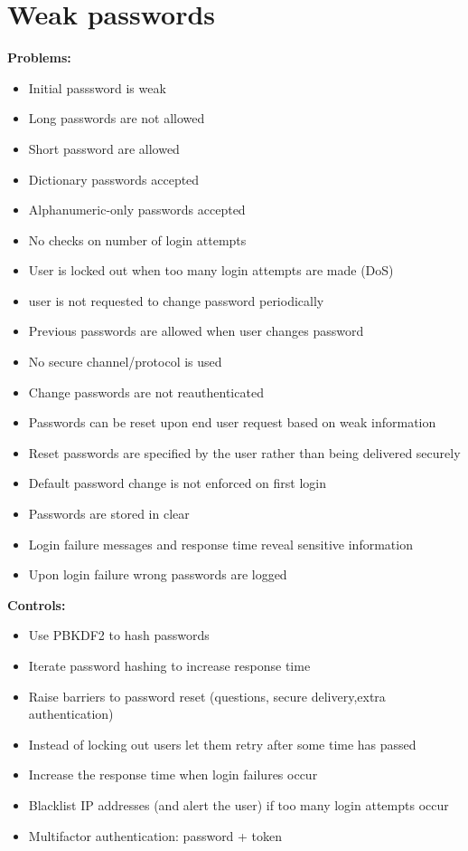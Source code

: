 \documentclass[10pt,a4paper]{article}
\begin{document}
\section{Weak passwords}
\textbf{Problems:}
\begin{itemize}
\item Initial passsword is weak
\item Long passwords are not allowed
\item Short password are allowed
\item Dictionary passwords accepted
\item Alphanumeric-only passwords accepted
\item No checks on number of login attempts
\item User is locked out when too many login attempts are made (DoS)
\item user is not requested to change password periodically
\item Previous passwords are allowed when user changes password
\item No secure channel/protocol is used
\item Change passwords are not reauthenticated
\item Passwords can be reset upon end user request based on weak information
\item Reset passwords are specified by the user rather than being delivered securely
\item Default password change is not enforced on first login
\item Passwords are stored in clear
\item Login failure messages and response time reveal sensitive information
\item Upon login failure wrong passwords are logged
\end{itemize}
\textbf{Controls:}
\begin{itemize}
\item Use PBKDF2 to hash passwords
\item Iterate password hashing to increase response time
\item Raise barriers to password reset (questions, secure delivery,extra authentication)
\item Instead of locking out users let them retry after some time has passed
\item Increase the response time when login failures occur
\item Blacklist IP addresses (and alert the user) if too many login attempts occur
\item Multifactor authentication: password + token
\end{itemize}
\end{document}
